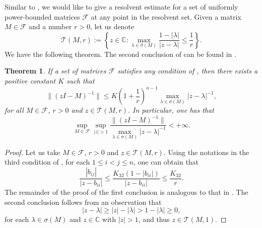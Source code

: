 \documentclass{article}
\theoremstyle{plain}%
\newtheorem{theorem}{Theorem}%
\theoremstyle{definition}%
\theoremstyle{remark}%
\newcommand{\bC}{\mathbb{C}}
\newcommand{\cF}{\mathcal{F}}
\newcommand{\cT}{\mathcal{T}}
\newcommand{\+}[1]{{\bm{#1}}}
\newcommand{\norm}[1]{\|{#1}\|}
\begin{document}
Similar to , we would like to give a 
resolvent estimate for a set of uniformly power-bounded matrices 
$\cF$ at any point in the resolvent set. Given a matrix $M \in \cF$ 
and a number $r > 0$, let us denote 
\begin{displaymath}
  \cT(M, r) := 
  \left\{ z \in \bC : \max_{\lambda \in \sigma(M)} 
  \frac{1 - |\lambda|}{|z - \lambda|} \le \frac{1}{r} \right\}.
\end{displaymath}
We have the following theorem. The second conclusion of 
 can be found in \cite{zarouf_sharpening_2009}.
\begin{theorem}\label{thm:main_power}
  If a set of matrices $\cF$ satisfies any condition of 
  , then there exists a positive constant $K$ 
  such that 
  \begin{displaymath}
    \norm{(z I - M)^{-1}} \le K \left( 1 + \frac{1}{r} \right)^{n - 1}
    \max_{\lambda \in \sigma(M)} |z - \lambda|^{-1},
  \end{displaymath}
  for all $M \in \cF$, $r > 0$ and $z \in \cT(M, r)$. In particular, 
  one has that 
  \begin{displaymath}
    \sup_{M \in \cF} \sup_{|z| > 1} 
    \frac{\norm{(z I - M)^{-1}}}{\max_{\lambda \in \sigma(M)} 
    |z - \lambda|^{-1}} < + \infty.
  \end{displaymath}
\end{theorem}

\begin{proof}
  Let us take $M \in \cF$, $r > 0$ and $z \in \cT(M, r)$. 
  Using the notations in the third condition of , 
  for each $1 \le i < j \le n$, one can obtain that 
  \begin{displaymath}
    \frac{|b_{ij}|}{|z - b_{ii}|} \le 
    \frac{K_{32} (1 - |b_{ii}|)}{|z - b_{ii}|} \le \frac{K_{32}}{r}.
  \end{displaymath}
  The remainder of the proof of the first conclusion is analogous to 
  that in . The second conclusion follows from 
  an observation that 
  \begin{displaymath}
    |z - \lambda| \ge |z| - |\lambda| > 1 - |\lambda| \ge 0,
  \end{displaymath}
  for each $\lambda \in \sigma(M)$ and $z \in \bC$ with $|z| > 1$, 
  and thus $z \in \cT(M, 1)$.
\end{proof}
\end{document}
